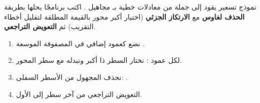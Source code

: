\clearpage
{}

\begin{statement}
نموذج تسعير يقود إلى جملة من  معادلات خطية بـ  مجاهيل . اكتب برنامجًا يحلها بطريقة \textbf{الحذف لغاوس} مع \textbf{الارتكاز الجزئي} (اختيار أكبر محور بالقيمة المطلقة لتقليل أخطاء التقريب) ثم \textbf{التعويض التراجعي}.
\end{statement}
\begin{stepsbox}\begin{enumerate}
\item نضع  كعمود إضافي في المصفوفة الموسعة .
\item لكل عمود : نختار السطر ذا أكبر  ونبدله مع سطر المحور.
\item نحذف المجهول من الأسطر السفلى: .
\item التعويض التراجعي من آخر سطر إلى الأول.
\end{enumerate}\end{stepsbox}
